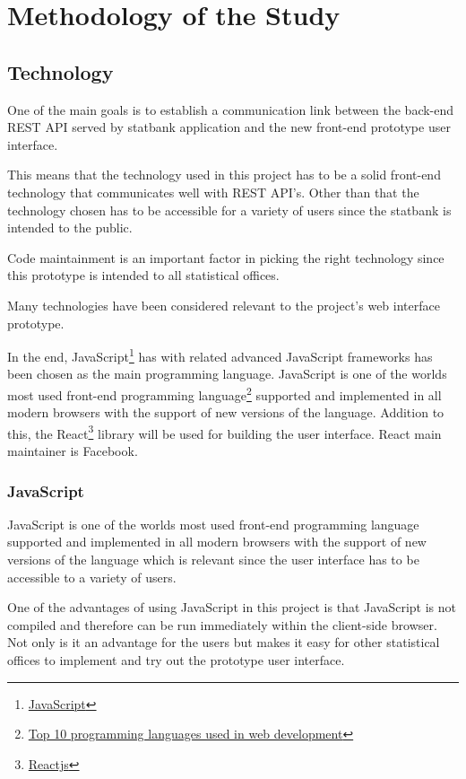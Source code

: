 
\chapter{Methodology of the Study}

\section{Technology}
One of the main goals is to establish a communication link between the back-end REST API served by statbank application and the new front-end prototype user interface. 

This means that the technology used in this project has to be a solid front-end technology that communicates well with REST API's. Other than that the technology chosen has to be accessible for a variety of users since the statbank is intended to the public. 

Code maintainment is an important factor in picking the right technology since this prototype is intended to all statistical offices.

Many technologies have been considered relevant to the project's web interface prototype.

In the end, JavaScript\footnote{\href{https://www.javascript.com/}{JavaScript}\label{javascript}} has with related advanced JavaScript frameworks has been chosen as the main programming language. JavaScript is one of the worlds most used front-end programming language\footnote{\href{http://blog.stoneriverelearning.com/top-10-programming-languages-used-in-web-development/}{Top 10 programming languages used in web development}\label{jstop10}} supported and implemented in all modern browsers with the support of new versions of the language. Addition to this, the React\footnote{\href{https://reactjs.org/}{Reactjs}\label{react}} library will be used for building the user interface. React main maintainer is Facebook.

\subsection{JavaScript}

JavaScript is one of the worlds most used front-end programming language supported and implemented in all modern browsers with the support of new versions of the language which is relevant since the user interface has to be accessible to a variety of users.

One of the advantages of using JavaScript in this project is that JavaScript is not compiled and therefore can be run immediately within the client-side browser. Not only is it an advantage for the users but makes it easy for other statistical offices to implement and try out the prototype user interface.  

